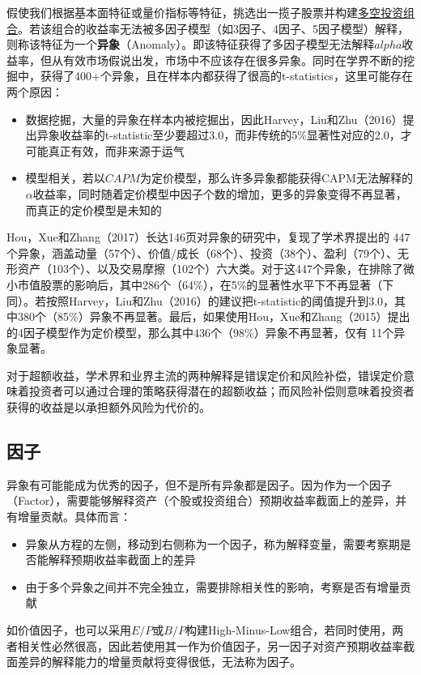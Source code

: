 \documentclass[11pt]{article}
\begin{document}
假使我们根据基本面特征或量价指标等特征，挑选出一揽子股票并构建\uline{多空投资组合}。若该组合的收益率无法被多因子模型（如3因子、4因子、5因子模型）解释，则称该特征为一个\textbf{异象}（Anomaly）。即该特征获得了多因子模型无法解释$alpha$收益率，但从有效市场假说出发，市场中不应该存在很多异象。同时在学界不断的挖掘中，获得了400+个异象，且在样本内都获得了很高的t-statistics，这里可能存在两个原因：
\begin{itemize}
    \item 数据挖掘，大量的异象在样本内被挖掘出，因此Harvey，Liu和Zhu（2016）提出异象收益率的t-statistic至少要超过3.0，而非传统的5\%显著性对应的2.0，才可能真正有效，而非来源于运气
    \item 模型相关，若以$CAPM$为定价模型，那么许多异象都能获得CAPM无法解释的$\alpha$收益率，同时随着定价模型中因子个数的增加，更多的异象变得不再显著，而真正的定价模型是未知的
\end{itemize}

Hou，Xue和Zhang（2017）长达146页对异象的研究中，复现了学术界提出的 447 个异象，涵盖动量（57个）、价值/成长（68个）、投资（38个）、盈利（79个）、无形资产（103个）、以及交易摩擦（102个）六大类。对于这447个异象，在排除了微小市值股票的影响后，其中286个（64\%），在5\%的显著性水平下不再显著（下同）。若按照Harvey，Liu和Zhu（2016）的建议把t-statistic的阈值提升到3.0，其中380个（85\%）异象不再显著。最后，如果使用Hou，Xue和Zhang（2015）提出的4因子模型作为定价模型，那么其中436个（98\%）异象不再显著，仅有 11个异象显著。

对于超额收益，学术界和业界主流的两种解释是错误定价和风险补偿，错误定价意味着投资者可以通过合理的策略获得潜在的超额收益；而风险补偿则意味着投资者获得的收益是以承担额外风险为代价的。

\subsection{因子}

异象有可能能成为优秀的因子，但不是所有异象都是因子。因为作为一个因子（Factor），需要能够解释资产（个股或投资组合）预期收益率截面上的差异，并有增量贡献。具体而言：
\begin{itemize}
    \item 异象从方程的左侧，移动到右侧称为一个因子，称为解释变量，需要考察期是否能解释预期收益率截面上的差异
    \item 由于多个异象之间并不完全独立，需要排除相关性的影响，考察是否有增量贡献
\end{itemize}

如价值因子，也可以采用$E/P$或$B/P$构建High-Minus-Low组合，若同时使用，两者相关性必然很高，因此若使用其一作为价值因子，另一因子对资产预期收益率截面差异的解释能力的增量贡献将变得很低，无法称为因子。
\end{document}

